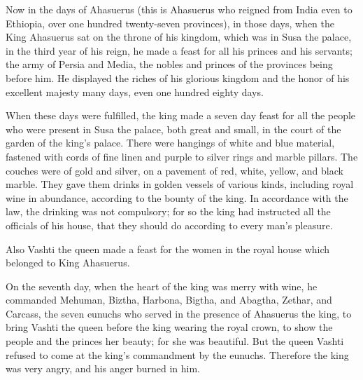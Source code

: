 





\vspace{-1.36in}

\mychapter{}\myverse*{}Now in the days of Ahasuerus (this is Ahasuerus who reigned from
India even to Ethiopia, over one hundred twenty-seven provinces),
\myverse{}in those days, when the King Ahasuerus sat on the throne of his kingdom, which
was in Susa the palace,
\myverse{}in the third year of his reign, he made a feast for all his princes and his
servants; the army of Persia and Media, the nobles and princes of the provinces being before him.
\myverse{}He displayed the riches of his glorious kingdom and the honor of his excellent
majesty many days, even one hundred eighty days.

\myverse{}When these days were fulfilled, the king made a seven day feast
for all the people who were present in Susa the palace, both great and small, in the court of the garden
of the king’s palace.
\myverse{}There were hangings of white and blue material, fastened with cords of fine
linen and purple to silver rings and marble pillars. The couches were of gold and silver, on a pavement
of red, white, yellow, and black marble.
\myverse{}They gave them drinks in golden vessels of various kinds, including royal wine
in abundance, according to the bounty of the king.
\myverse{}In accordance with the law, the drinking was not compulsory; for so the king
had instructed all the officials of his house, that they should do according to every man’s pleasure.

\myverse{}Also Vashti the queen made a feast for the women in the royal house
which belonged to King Ahasuerus.

\myverse{}On the seventh day, when the heart of the king was merry with
wine, he commanded Mehuman, Biztha, Harbona, Bigtha, and Abagtha, Zethar, and Carcass, the seven eunuchs
who served in the presence of Ahasuerus the king,
\myverse{}to bring Vashti the queen before the king wearing the royal crown, to show
the people and the princes her beauty; for she was beautiful.
\myverse{}But the queen Vashti refused to come at the king’s commandment by the eunuchs.
Therefore the king was very angry, and his anger burned in him.

